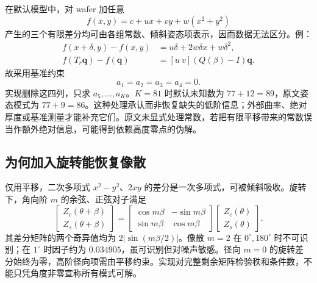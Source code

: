 \documentclass[UTF8,a4paper,zihao=-4]{ctexart}
\begin{document}
在默认模型中，对 wafer 加任意
\begin{equation}
f(x,y)=c+u x+v y+w(x^2+y^2)
\end{equation}
产生的三个有限差分均可由各组常数、倾斜姿态项表示，因而数据无法区分。例：
\begin{align}
f(x+\delta,y)-f(x,y)&=u\delta+2w\delta x+w\delta^2,\\
f(T_r\bm q)-f(\bm q)&=[u\ v](Q(\beta)-I)\bm q.
\end{align}
故采用基准约束
\begin{equation}\boxed{a_1=a_2=a_3=a_4=0.}\end{equation}
实现删除这四列，只求 $a_5,\ldots,a_K$。$K=81$ 时默认未知数为 $77+12=89$，原文姿态模式为 $77+9=86$。这种处理承认而非恢复缺失的低阶信息；外部曲率、绝对厚度或基准测量才能补充它们。原文未显式处理常数，若把有限平移带来的常数误当作额外绝对信息，可能得到依赖高度零点的伪解。

\subsection{为何加入旋转能恢复像散}
仅用平移，二次多项式 $x^2-y^2$、$2xy$ 的差分是一次多项式，可被倾斜吸收。旋转下，角向阶 $m$ 的余弦、正弦对子满足
\begin{equation}
\begin{bmatrix}Z_c(\theta+\beta)\\Z_s(\theta+\beta)\end{bmatrix}
=\begin{bmatrix}\cos m\beta&-\sin m\beta\\\sin m\beta&\cos m\beta\end{bmatrix}
\begin{bmatrix}Z_c(\theta)\\Z_s(\theta)\end{bmatrix}.
\end{equation}
其差分矩阵的两个奇异值均为 $2|\sin(m\beta/2)|$。像散 $m=2$ 在 $0^\circ,180^\circ$ 时不可识别；在 $1^\circ$ 时因子约为 $0.034905$，虽可识别但对噪声敏感。径向 $m=0$ 的旋转差分始终为零，高阶径向项需由平移约束。实现对完整剩余矩阵检验秩和条件数，不能只凭角度非零宣称所有模式可解。
\end{document}
